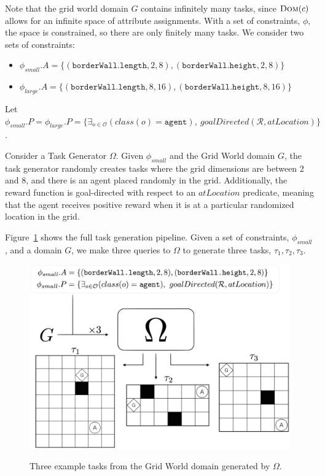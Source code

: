 \documentclass[11pt]{article}
\begin{document}
Note that the grid world domain $G$ contains infinitely many tasks, since $\textsc{Dom}(c)$ allows for an infinite space of attribute assignments. With a set of constraints, $\phi$, the space is constrained, so there are only finitely many tasks. We consider two sets of constraints:

\begin{itemize}
\item $\phi_{small}.A = \{ (\texttt{borderWall.length}, 2, 8), (\texttt{borderWall.height}, 2, 8) \}$
\item $\phi_{large}.A = \{ (\texttt{borderWall.length}, 8, 16), (\texttt{borderWall.height}, 8, 16) \}$
\end{itemize}

Let $\phi_{small}.P = \phi_{large}.P = \{\exists_{o \in \mathcal{O}} \left(class(o) = \texttt{agent}\right),\ goalDirected(\mathcal{R}, atLocation)\}$.

Consider a Task Generator $\Omega$. Given $\phi_{small}$ and the Grid World domain $G$, the task generator randomly creates tasks where the grid dimensions are between 2 and 8, and there is an agent placed randomly in the grid. Additionally, the reward function is goal-directed with respect to an $atLocation$ predicate, meaning that the agent receives positive reward when it is at a particular randomized location in the grid.

Figure~\ref{fig:task_generator} shows the full task generation pipeline. Given a set of constraints, $\phi_{small}$, and a domain $G$, we make three queries to $\Omega$ to generate three tasks, $\tau_1, \tau_2, \tau_3$.

\begin{figure}
\centering
\includegraphics[width=0.7\linewidth]{figures/task_generator.png}
\label{fig:task_generator}
\caption{Three example tasks from the Grid World domain generated by $\Omega$.}
\end{figure}
\end{document}
